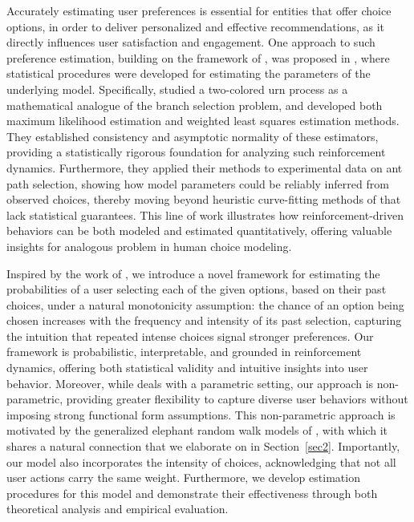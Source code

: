 \documentclass[12pt]{amsart}
\theoremstyle{plain}
\theoremstyle{remark}
\numberwithin{equation}{section}
\begin{document}
Accurately estimating user preferences is essential for entities that offer choice options, in order to deliver personalized and effective recommendations, as it directly influences user satisfaction and engagement. One approach to such preference estimation, building on the framework of \cite{deneubourg1990self}, was proposed in \cite{MR3657899}, where statistical procedures were developed for estimating the parameters of the underlying model. Specifically, \cite{MR3657899} studied a two-colored urn process as a mathematical analogue of the branch selection problem, and developed both maximum likelihood estimation and weighted least squares estimation methods. They established consistency and asymptotic normality of these estimators, providing a statistically rigorous foundation for analyzing such reinforcement dynamics. Furthermore, they applied their methods to experimental data on ant path selection, showing how model parameters could be reliably inferred from observed choices, thereby moving beyond heuristic curve-fitting methods of \cite{deneubourg1990self} that lack statistical guarantees. This line of work illustrates how reinforcement-driven behaviors can be both modeled and estimated quantitatively, offering valuable insights for analogous problem in human choice modeling.

Inspired by the work of \cite{MR3657899}, we introduce a novel framework for estimating the probabilities of a user selecting each of the given options,  based on their past choices, under a natural monotonicity assumption: the chance of an option being chosen increases with the frequency and intensity of its past selection, capturing the intuition that repeated intense choices signal stronger preferences. 
Our framework is probabilistic, interpretable, and grounded in reinforcement dynamics, offering both statistical validity and intuitive insights into user behavior. Moreover, while \cite{MR3657899} deals with a parametric setting, our approach is non-parametric, providing greater flexibility to capture diverse user behaviors without imposing strong functional form assumptions. This non-parametric approach is motivated by the generalized elephant random walk models of \cite{gerw}, with which it shares a natural connection that we elaborate on in Section~\ref{sec2}. Importantly, our model also incorporates the intensity of choices, acknowledging that not all user actions carry the same weight. Furthermore, we develop estimation procedures for this model and demonstrate their effectiveness through both theoretical analysis and empirical evaluation. 
\end{document}
